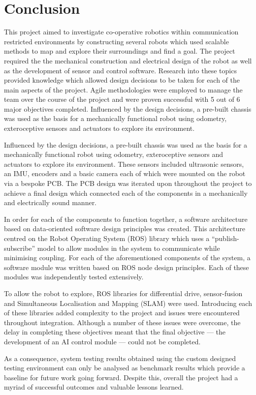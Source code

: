 
\chapter{Conclusion}\label{conclusion}
This project aimed to investigate co-operative robotics within 
communication restricted environments by constructing several robots 
which used scalable methods to map and explore their surroundings and find 
a goal. The project required the the mechanical construction and 
electrical design of the robot as well as the development of sensor and 
control software.  Research into these topics provided knowledge which 
allowed 
design decisions to be taken for each of the main aspects of the project. 
Agile methodologies were employed to manage the team over the course of 
the project and were proven successful with 5 out of 6 major objectives 
completed. Influenced by the design decisions, a pre-built chassis was 
used as the basis for a mechanically functional robot using odometry, 
exteroceptive sensors and actuators to explore its environment. 


Influenced by the design decisions, a pre-built chassis was 
used as the basis for a mechanically functional robot using odometry, 
exteroceptive sensors and actuators to explore its environment. These sensors included ultrasonic sensors, an IMU, encoders and a basic 
camera each of which were mounted on the robot via a bespoke PCB. The PCB 
design was iterated upon throughout the project to achieve a final design 
which connected each of the components in a mechanically and 
electrically sound manner. 

In order for each of the components to function together, a software 
architecture based on data-oriented software design principles was 
created. This architecture centred on the Robot Operating System (ROS) 
library which uses a ``publish-subscribe'' model to allow modules in the 
system to communicate while minimising coupling. For each of the aforementioned components of the 
system, a software module was written based on ROS node design principles. 
Each of these modules was independently tested extensively. 

To allow the robot to explore, ROS libraries for differential drive, 
sensor-fusion and Simultaneous Localisation and Mapping (SLAM) were used. 
Introducing each of these libraries added complexity to the project and 
issues were encountered throughout integration. Although a number of these 
issues were overcome, the delay in completing these objectives meant that 
the final objective --- the development of an AI control module --- could not 
be completed. 

As a consequence, system testing results obtained using the custom designed testing environment can only be analysed as 
benchmark results which provide a baseline for future work going forward. 
Despite this, overall the project had a myriad of successful outcomes and 
valuable lessons learned.      

